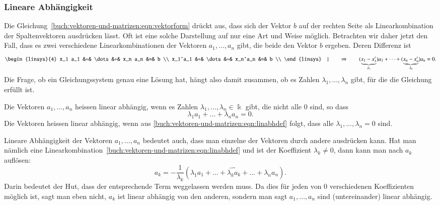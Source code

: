\subsubsection{Lineare Abhängigkeit}
Die Gleichung~\eqref{buch:vektoren-und-matrizen:eqn:vektorform}
drückt aus, dass sich der Vektor $b$ auf der rechten Seite als
Linearkombination der Spaltenvektoren ausdrücken lässt.
Oft ist eine solche Darstellung auf nur eine Art und Weise möglich.
Betrachten wir daher jetzt den Fall, dass es zwei verschiedene
Linearkombinationen der Vektoren $a_1,\dots,a_n$ gibt, die beide den
Vektor $b$ ergeben.
Deren Differenz ist
\begin{equation}
\left.
\begin{linsys}{4}
x_1 a_1 &+& \dots &+& x_n a_n &=& b \\
x_1'a_1 &+& \dots &+& x_n'a_n &=& b \\
\end{linsys}
\quad\right\}
\qquad
\Rightarrow
\qquad
(\underbrace{x_1-x_1'}_{\lambda_1}) a_1
+
\dots
+
(\underbrace{x_n-x_n'}_{\lambda_n}) a_n
=
0.
\label{buch:vektoren-und-matrizen:eqn:linabhkomb}
\end{equation}
Die Frage, ob ein Gleichungssystem genau eine Lösung hat, hängt also
damit zusammen, ob es Zahlen $\lambda_1,\dots,\lambda_n$ gibt, für
die die Gleichung~\label{buch:vektoren-und-matrizen:eqn:linabhkomb}
erfüllt ist.

\begin{definition}
Die Vektoren $a_1,\dots,a_n$ heissen linear abhängig, wenn es Zahlen
$\lambda_1,\dots,\lambda_n\in\Bbbk$ gibt, die nicht alle $0$ sind, so dass
\begin{equation}
\lambda_1a_1+\dots+\lambda_na_n = 0.
\label{buch:vektoren-und-matrizen:eqn:linabhdef}
\end{equation}
Die Vektoren heissen linear abhängig, wenn aus
\eqref{buch:vektoren-und-matrizen:eqn:linabhdef}
folgt, dass alle $\lambda_1,\dots,\lambda_n=0$ sind.
\end{definition}

Lineare Abhängigkeit der Vektoren $a_1,\dots,a_n$ bedeutet auch, dass
man einzelne der Vektoren durch andere ausdrücken kann.
Hat man nämlich eine
Linearkombination~\eqref{buch:vektoren-und-matrizen:eqn:linabhdef} und
ist der Koeffizient $\lambda_k\ne 0$, dann kann man nach $a_k$ auflösen:
\[
a_k = -\frac{1}{\lambda_k}(\lambda_1a_1+\dots+\widehat{\lambda_ka_k}+\dots+\lambda_na_n).
\]
Darin bedeutet der Hut, dass der entsprechende Term weggelassen werden
muss.
Da dies für jeden von $0$ verschiedenen Koeffizienten möglich ist,
sagt man eben nicht, $a_k$ ist linear abhängig von den anderen, sondern
man sagt $a_1,\dots,a_n$ sind (untereinander) linear abhängig.


